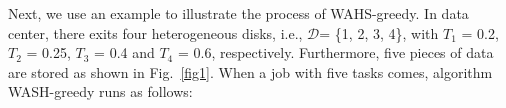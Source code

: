 \documentclass[conference]{IEEEtran}
\begin{document}


Next, we use an example to illustrate the process of WAHS-greedy. In data center, there exits four heterogeneous disks, i.e., $\mathcal{D}$= \{1, 2, 3, 4\}, with $T_1$ = 0.2,  $T_2$ = 0.25,  $T_3$ = 0.4 and $T_4$ = 0.6, respectively. Furthermore, five pieces of data are stored as shown in Fig.~\ref{fig1}. When a job with five tasks comes, algorithm WASH-greedy runs as follows: %
\end{document}
